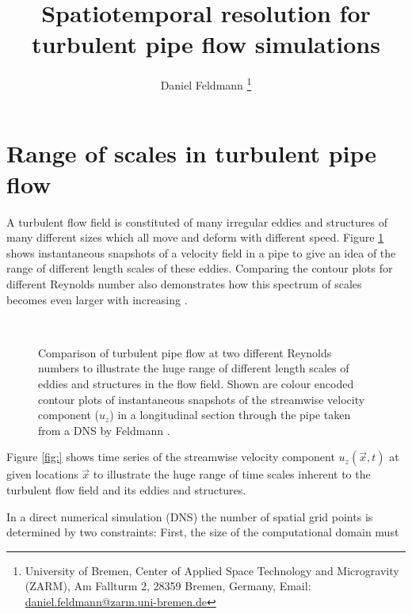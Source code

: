 \documentclass[a4paper, 11pt, twoside, DIV=12]{scrartcl}
\title{Spatiotemporal resolution for\\ turbulent pipe flow simulations}
\subtitle{\vspace{-2.0ex}}
\author{Daniel Feldmann%
\thanks{University of Bremen,
Center of Applied Space Technology and Microgravity (ZARM),
Am Fallturm 2, 28359 Bremen, Germany,
Email: \url{daniel.feldmann@zarm.uni-bremen.de}}
}
\begin{document}
%
\maketitle
%
\section{Range of scales in turbulent pipe flow}
A turbulent flow field is constituted of many irregular eddies and structures of
many different sizes which all move and deform with different speed. Figure
\ref{fig:plotPipePhiCompare} shows instantaneous snapshots of a velocity field
in a pipe to give an idea of the range of different length scales of these
eddies. Comparing the contour plots for different Reynolds number also
demonstrates how this spectrum of scales becomes even larger with increasing
\Reynolds.
\begin{figure}[htb]
\centering
{}\\
\caption{Comparison of turbulent pipe flow at two different Reynolds numbers to
illustrate the huge range of different length scales of eddies and structures in
the flow field. Shown are colour encoded contour plots of instantaneous
snapshots of the streamwise velocity component ($u_z$) in a longitudinal section
through the pipe taken from a DNS by Feldmann \cite{Feldmann2015c}.}
\label{fig:plotPipePhiCompare}
\end{figure}
Figure \ref{fig:} shows time series of the streamwise velocity component
$u_z(\vec{x},t)$ at given locations $\vec{x}$ to illustrate the huge range of
time scales inherent to the turbulent flow field and its eddies and structures.
\par
In a direct numerical simulation (DNS) the number of spatial grid points is
determined by two constraints: First, the size of the computational domain must
\end{document}
